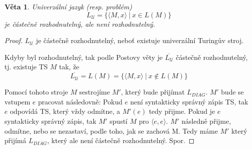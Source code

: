 \documentclass[11pt]{report} %
\newtheorem{theorem}{Věta}[section]
\numberwithin{equation}{section}
\begin{document}
\begin{theorem}
Univerzální jazyk (resp. problém) 
$$L_\mathcal{U} = \{\langle M, x\rangle\ |\ x \in L(M) \}$$
je částečně rozhodnutelný, ale není rozhodnutelný.
\end{theorem}
\begin{proof}
$L_\mathcal{U}$ je částečně rozhodnutelný, neboť existuje univerzální Turingův stroj.

Kdyby byl rozhodnutelný, tak podle Postovy věty je $\overline{L_\mathcal{U}}$ částečně rozhodnutelný, tj. existuje TS $M$ tak, že 
$$\overline{L_\mathcal{U}} = L(M) = \{\langle M,x\rangle\ |\ x \notin L(M)\}$$

Pomocí tohoto stroje $M$ sestrojíme $M'$, který bude přijímat $L_{DIAG}$. $M'$ bude se vstupem $e$ pracovat následovně: Pokud $e$ není syntakticky správný zápis TS, tak $e$ odpovídá TS, který vždy odmítne, a $M'(e)$ tedy přijme. Pokud je $e$ syntakticky správný zápis, tak $M'$ spustí $M$ pro $\langle e,e\rangle$. $M'$ následně přijme, odmítne, nebo se nezastaví, podle toho, jak se zachová M. Tedy máme $M'$ který přijímá $L_{DIAG}$, který ale není částečně rozhodnutelný. Spor.
\end{proof}
\end{document}
